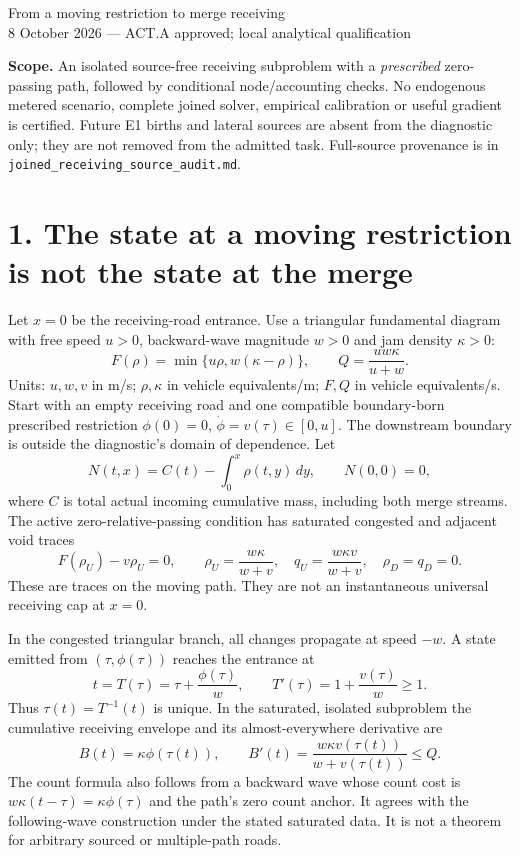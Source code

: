 \documentclass[11pt,a4paper]{article}
\begin{document}
{\Large From a moving restriction to merge receiving}\\[4pt]
8 October 2026 --- ACT.A approved; local analytical qualification

\textbf{Scope.} An isolated source-free receiving subproblem with a
\emph{prescribed} zero-passing path, followed by conditional node/accounting
checks. No endogenous metered scenario, complete joined solver, empirical
calibration or useful gradient is certified. Future E1 births and lateral
sources are absent from the diagnostic only; they are not removed from the
admitted task. Full-source provenance is in
\texttt{joined\_receiving\_source\_audit.md}.

\section*{1. The state at a moving restriction is not the state at the merge}
Let $x=0$ be the receiving-road entrance. Use a triangular fundamental diagram
with free speed $u>0$, backward-wave magnitude $w>0$ and jam density $\kappa>0$:
\begin{equation}
 F(\rho)=\min\{u\rho,w(\kappa-\rho)\},\qquad
 Q=\frac{uw\kappa}{u+w}.
\end{equation}
Units: $u,w,v$ in m/s; $\rho,\kappa$ in vehicle equivalents/m;
$F,Q$ in vehicle equivalents/s. Start with an empty receiving road and one
compatible boundary-born prescribed restriction $\phi(0)=0$,
$\dot\phi=v(\tau)\in[0,u]$. The downstream boundary is outside the diagnostic's
domain of dependence. Let
\begin{equation}
 N(t,x)=C(t)-\int_0^x\rho(t,y)\,dy,\qquad N(0,0)=0,
\end{equation}
where $C$ is total actual incoming cumulative mass, including both merge
streams. The active zero-relative-passing condition has saturated congested
and adjacent void traces
\begin{equation}
 F(\rho_U)-v\rho_U=0,\qquad
 \rho_U=\frac{w\kappa}{w+v},\quad
 q_U=\frac{w\kappa v}{w+v},\quad \rho_D=q_D=0.
\end{equation}
These are traces on the moving path. They are not an instantaneous universal
receiving cap at $x=0$.

In the congested triangular branch, all changes propagate at speed $-w$.
A state emitted from $(\tau,\phi(\tau))$ reaches the entrance at
\begin{equation}
 t=T(\tau)=\tau+\frac{\phi(\tau)}{w},\qquad
 T'(\tau)=1+\frac{v(\tau)}{w}\ge1.
\end{equation}
Thus $\tau(t)=T^{-1}(t)$ is unique. In the saturated, isolated subproblem the
cumulative receiving envelope and its almost-everywhere derivative are
\begin{equation}
 B(t)=\kappa\phi(\tau(t)),\qquad
 B'(t)=\frac{w\kappa v(\tau(t))}{w+v(\tau(t))}\le Q.
\end{equation}
The count formula also follows from a backward wave whose count cost is
$w\kappa(t-\tau)=\kappa\phi(\tau)$ and the path's zero count anchor.
It agrees with the following-wave construction under the stated saturated
data. It is not a theorem for arbitrary sourced or multiple-path roads.
\end{document}
